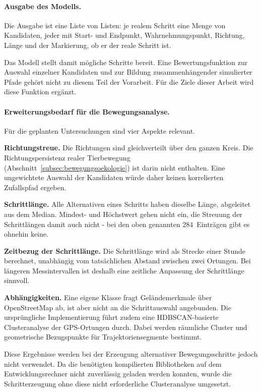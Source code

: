 \documentclass[12pt,a4paper]{report}
\begin{document}
\paragraph{Ausgabe des Modells.}

Die Ausgabe ist eine Liste von Listen: je realem Schritt eine Menge von Kandidaten, jeder
mit Start- und Endpunkt, Wahrnehmungspunkt, Richtung, Länge und der Markierung, ob er der
reale Schritt ist.

Das Modell stellt damit mögliche Schritte bereit. Eine Bewertungsfunktion zur Auswahl
einzelner Kandidaten und zur Bildung zusammenhängender simulierter Pfade gehört nicht
zu diesem Teil der Vorarbeit. Für die Ziele dieser Arbeit wird diese Funktion ergänzt.

\paragraph{Erweiterungsbedarf für die Bewegungsanalyse.}
\label{subsubsec:limitationen-simulation}

Für die geplanten Untersuchungen sind vier Aspekte relevant.

\textbf{Richtungstreue.} Die Richtungen sind gleichverteilt über den ganzen Kreis. Die
Richtungspersistenz realer Tierbewegung (Abschnitt~\ref{subsec:bewegungsoekologie}) ist
darin nicht enthalten. Eine ungewichtete Auswahl der Kandidaten würde daher keinen
korrelierten Zufallspfad ergeben.

\textbf{Schrittlänge.} Alle Alternativen eines Schritts haben dieselbe Länge, abgeleitet aus
dem Median. Mindest- und Höchstwert gehen nicht ein, die Streuung der Schrittlängen damit
auch nicht - bei den oben genannten 284~Einträgen gibt es ohnehin keine.

\textbf{Zeitbezug der Schrittlänge.} Die Schrittlänge wird als Strecke einer Stunde
berechnet, unabhängig vom tatsächlichen Abstand zwischen zwei Ortungen. Bei längeren
Messintervallen ist deshalb eine zeitliche Anpassung der Schrittlänge sinnvoll.


\textbf{Abhängigkeiten.} Eine eigene Klasse fragt
Geländemerkmale über OpenStreetMap ab, ist
aber nicht an die Schrittauswahl angebunden.
Die ursprüngliche Implementierung führt zudem
eine HDBSCAN-basierte Clusteranalyse der
GPS-Ortungen durch. Dabei werden räumliche
Cluster und geometrische Bezugspunkte für
Trajektoriensegmente bestimmt.

Diese Ergebnisse werden bei der Erzeugung
alternativer Bewegungsschritte jedoch nicht
verwendet. Da die benötigten kompilierten
Bibliotheken auf dem Entwicklungsrechner
nicht zuverlässig geladen werden konnten,
wurde die Schritterzeugung ohne diese
nicht erforderliche Clusteranalyse umgesetzt.
\end{document}
